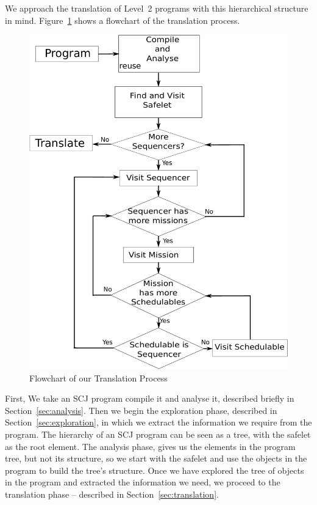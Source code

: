 \documentclass[10pt,a4paper]{article}
\begin{document}
We approach the translation of Level~2 programs with this hierarchical structure in mind. Figure~\ref{fig:translationFlow} shows a flowchart of the translation process.
\begin{figure}[h!]
\begin{center}
\includegraphics[scale=0.5]{translation.pdf}
\caption{Flowchart of our Translation Process \label{fig:translationFlow} }
\end{center}
\end{figure}
First, We take an SCJ program compile it and analyse it, described briefly in Section~\ref{sec:analysis}. Then we begin the exploration phase, described in Section~\ref{sec:exploration}, in which we extract the information we require from the program. The hierarchy of an SCJ program can be seen as a tree, with the safelet as the root element. The analysis phase, gives us the elements in the program tree, but not its structure, so we start with the safelet and use the objects in the program to build the tree's structure. Once we have explored the tree of objects in the program and extracted the information we need, we proceed to the translation phase -- described in Section~\ref{sec:translation}.
\end{document}
